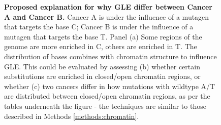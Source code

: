 \begin{figure}[ht!]
  \begin{minipage}[c]{\textwidth}
    \caption{
      \textbf{Proposed explanation for why GLE differ between Cancer A and Cancer B.} Cancer A is under the influence of a mutagen that targets the base C; Cancer B is under the influence of a mutagen that targets the base T. Panel (a) Some regions of the genome are more enriched in C, others are enriched in T. The distribution of bases combines with chromatin structure to influence GLE. This could be evaluated by assessing (b) whether certain substitutions are enriched in closed/open chromatin regions, or whether (c) two cancers differ in how mutations with wildtype A/T are distributed between closed/open chromatin regions, as per the tables underneath the figure - the techniques are similar to those described in Methods \ref{methods:chromatin}.
    } \label{fig:discussion_gle}
  \end{minipage}
\end{figure}

